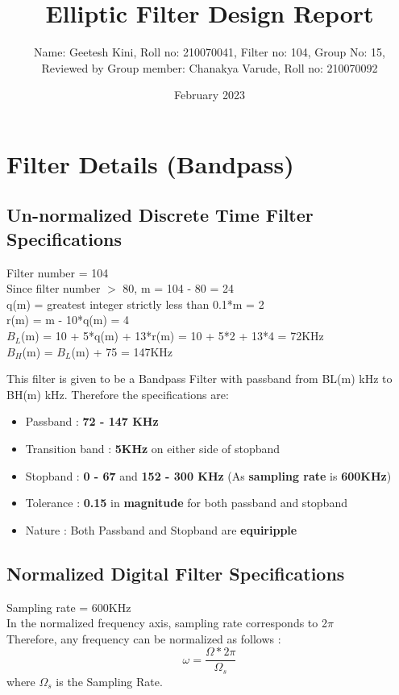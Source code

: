 \documentclass{article}
\title{Elliptic Filter Design Report}
\author{Name: Geetesh Kini, Roll no: 210070041, Filter no: 104, Group No: 15,\\ Reviewed by Group member: Chanakya Varude, Roll no: 210070092}
\date{February 2023}
\begin{document}
\maketitle

\tableofcontents
\clearpage

\section{Filter Details (Bandpass)}

\subsection{Un-normalized Discrete Time Filter Specifications}

Filter number = 104\\
Since filter number $>$ 80, m = 104 - 80 = 24\\
q(m) = greatest integer strictly less than 0.1*m = 2\\
r(m) = m - 10*q(m) = 4\\
$B_L$(m) = 10 + 5*q(m) + 13*r(m) = 10 + 5*2 + 13*4 = 72KHz \\
$B_H$(m) = $B_L$(m) + 75 = 147KHz\\

\vspace{1.5em}
\noindent

This filter is given to be a Bandpass Filter with passband from BL(m) kHz to BH(m) kHz.
Therefore the specifications are:
\begin{itemize}
    \item Passband : \textbf{72 - 147 KHz}
    \item  Transition band : \textbf{5KHz} on either side of stopband
    \item Stopband : \textbf{0 - 67} and \textbf{152 - 300 KHz} (As \textbf{sampling rate} is \textbf{600KHz})

    \item  Tolerance : \textbf{0.15} in \textbf{magnitude} for both passband and stopband
    \item  Nature : Both Passband and Stopband are \textbf{equiripple}
\end{itemize}

\subsection{Normalized Digital Filter Specifications}
Sampling rate = 600KHz\\
In the normalized frequency axis, sampling rate corresponds to 2$\pi$\\
Therefore, any frequency can be normalized as follows :
\begin{equation*}
    \omega = \frac{\Omega*2\pi}{\Omega_s}
\end{equation*}
where $\Omega_s$ is the Sampling Rate.\\
\end{document}
